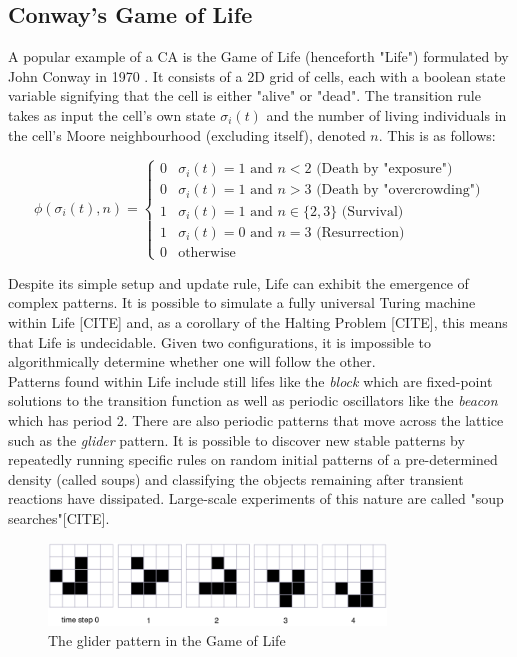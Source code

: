 \subsection{Conway's Game of Life}
A popular example of a CA is the Game of Life (henceforth "Life") formulated by John Conway in 1970 \cite{gardner1970fantastic}. It consists of a 2D grid of cells, each with a boolean state variable signifying that the cell is either "alive" or "dead". The transition rule takes as input the cell's own state $\sigma_i(t)$ and the number of living individuals in the cell's Moore neighbourhood (excluding itself), denoted $n$. This is as follows:

\begin{equation}
  \phi(\sigma_i(t), n) = 
\begin{cases}
  0 & \sigma_i(t) = 1 \text{ and } n < 2 \text{  (Death by "exposure")}\\
  0 & \sigma_i(t) = 1 \text{ and } n > 3 \text{  (Death by "overcrowding")}\\
  1 & \sigma_i(t) = 1 \text{ and } n \in \{2,3\} \text{  (Survival)}\\
  1 & \sigma_i(t) = 0 \text{ and } n = 3 \text{  (Resurrection)}\\
  0 & \text{otherwise}
\end{cases}
\end{equation}

Despite its simple setup and update rule, Life can exhibit the emergence of complex patterns. It is possible to simulate a fully universal Turing machine within Life [CITE] and, as a corollary of the Halting Problem [CITE], this means that Life is undecidable. Given two configurations, it is impossible to algorithmically determine whether one will follow the other.\\

Patterns found within Life include still lifes like the \textit{block} which are fixed-point solutions to the transition function as well as periodic oscillators like the \textit{beacon} which has period 2. There are also periodic patterns that move across the lattice such as the \textit{glider} pattern. It is possible to discover new stable patterns by repeatedly running specific rules on random initial patterns of a pre-determined density (called soups) and classifying the objects remaining after transient reactions have dissipated. Large-scale experiments of this nature are called "soup searches"[CITE].\\

\begin{figure}[!h]
\centering
\includegraphics[width=0.8\textwidth]{images/life-glider.png}
\caption{The glider pattern in the Game of Life \cite{dorin2012framework}}
\label{fig:life-glider}
\end{figure}

